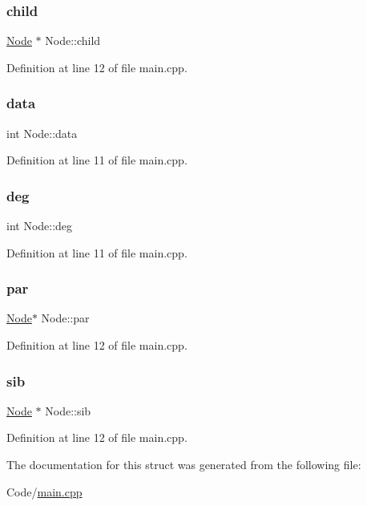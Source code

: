 \subsubsection{\texorpdfstring{child}{child}}
{\footnotesize\ttfamily \hyperlink{struct_node}{Node} $\ast$ Node\+::child}



Definition at line 12 of file main.\+cpp.

\mbox{\label{struct_node_a87c003c9f600e3fc58e6e90835f0b605}} 
\subsubsection{\texorpdfstring{data}{data}}
{\footnotesize\ttfamily int Node\+::data}



Definition at line 11 of file main.\+cpp.

\mbox{\label{struct_node_a7e62acb60050120d8d3d5b8fb640bbcb}} 
\subsubsection{\texorpdfstring{deg}{deg}}
{\footnotesize\ttfamily int Node\+::deg}



Definition at line 11 of file main.\+cpp.

\mbox{\label{struct_node_abc9a07a65bab86d77438b34e607ba148}} 
\subsubsection{\texorpdfstring{par}{par}}
{\footnotesize\ttfamily \hyperlink{struct_node}{Node}$\ast$ Node\+::par}



Definition at line 12 of file main.\+cpp.

\mbox{\label{struct_node_a2df7d905421f931a2b076706e7daed1b}} 
\subsubsection{\texorpdfstring{sib}{sib}}
{\footnotesize\ttfamily \hyperlink{struct_node}{Node} $\ast$ Node\+::sib}



Definition at line 12 of file main.\+cpp.



The documentation for this struct was generated from the following file\+:\begin{DoxyCompactItemize}
\item 
Code/\hyperlink{main_8cpp}{main.\+cpp}\end{DoxyCompactItemize}
